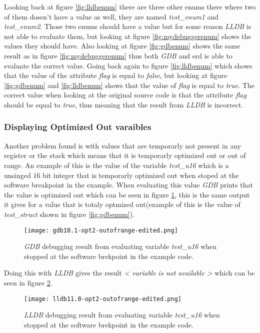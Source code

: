 Looking back at figure \ref{fig:lldbenum} there are three other enums there where two of them dosen't have a value as well, they are named \emph{test\_enum1} and \emph{test\_enum2}.
Those two enums should have a value but for some reason \emph{LLDB} is not able to evaluate them, but looking at figure \ref{fig:mydebuggerenum} shows the values they should have.
Also looking at figure \ref{fig:gdbenum} shows the same result as in figure \ref{fig:mydebuggerenum} thus both \emph{GDB} and \gls{erd} is able to evaluate the correct value.
Going back again to figure \ref{fig:lldbenum} which shows that the value of the attribute \emph{flag} is equal to \emph{false}, but looking at figure \ref{fig:gdbenum} and \ref{fig:lldbenum} shows that the value of \emph{flag} is equal to \emph{true}.
The correct value when looking at the original source code is that the attribute \emph{flag} should be equal to \emph{true}, thus meaning that the result from \emph{LLDB} is incorrect.



\subsubsection{Displaying Optimized Out varaibles}
Another problem found is with values that are temporarly not present in any register or the stack which means that it is temporarly optimized out or out of range.
An example of this is the value of the variable \emph{test\_u16} which is a unsinged $16$ bit integer that is temporarly optimized out when stoped at the software breakpoint in the example.
When evaluating this value \emph{GDB} prints that the value is optimized out which can be seen in figure \ref{fig:gdboutofrange}, this is the same output it gives for a value that is totaly optmized out(example of this is the value of \emph{test\_struct} shown in figure \ref{fig:gdbenum}).


\begin{figure}[h]
	\centering
	\texttt{[image: gdb10.1-opt2-outofrange-edited.png]}
	\caption{\emph{GDB} debugging result from evaluating variable \emph{test\_u16} when stopped at the software brekpoint in the example code.}
    	\label{fig:gdboutofrange}
\end{figure}


Doing this with \emph{LLDB} gives the result  \emph{< variable is not available >} which can be seen in figure \ref{fig:lldboutofrange}.


\begin{figure}[h]
	\centering
	\texttt{[image: lldb11.0-opt2-outofrange-edited.png]}
	\caption{\emph{LLDB} debugging result from evaluating variable \emph{test\_u16} when stopped at the software brekpoint in the example code.}
	\label{fig:lldboutofrange}
\end{figure}


